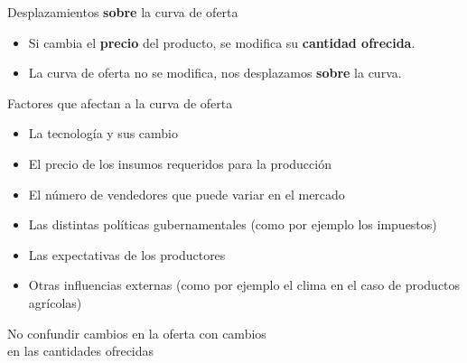 \documentclass{beamer}
\begin{document}
\begin{frame}{Desplazamientos \textbf{sobre} la curva de oferta}
        \begin{itemize}
            \item Si cambia el \textbf{precio} del producto, se modifica su \textbf{cantidad ofrecida}.
            \item La curva de oferta no se modifica, nos desplazamos \textbf{sobre} la curva.\vspace{1mm}
        \end{itemize}
        \begin{center}
        \end{center}
    \end{frame}

\begin{frame}{Factores que afectan a la curva de oferta}
    \begin{itemize}
        \item La tecnología y sus cambio
        \item El precio de los insumos requeridos para la producción
        \item El número de vendedores que puede variar en el mercado
        \item Las distintas políticas gubernamentales (como por ejemplo los impuestos)
        \item Las expectativas de los productores
        \item Otras influencias externas (como por ejemplo el clima en el caso de productos agrícolas)  
    \end{itemize}
    \begin{boxB}
        \begin{center}
          No confundir cambios en la oferta con cambios \\ en las cantidades ofrecidas
        \end{center}
    \end{boxB}
\end{frame}
\end{document}
